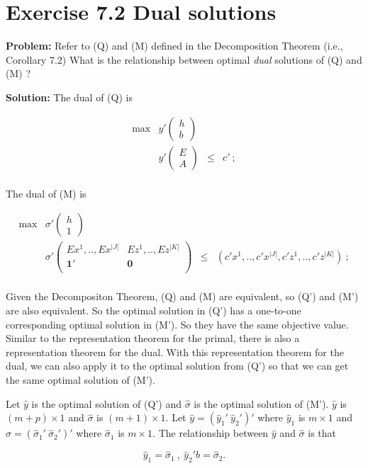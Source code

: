 \section{Exercise 7.2 Dual solutions}
\textbf{Problem:} Refer to (Q) and (M) defined in the Decomposition Theorem (i.e., Corollary 7.2) What is the relationship between optimal \emph{dual} solutions of (Q) and (M) ?

\textbf{Solution:} The dual of (Q) is

\[
\tag{$Q'$}
\begin{array}{ccrrcl}
 \max & y'\left(
  \begin{array}{c}
   h\\
   b
  \end{array}
\right)  &      &   \\
      &  y'\left(
  \begin{array}{c}
   E\\
   A
  \end{array}
\right)  &   \leq  & c'~; \\
\end{array}
\]

The dual of (M) is

\[
\tag{$M'$}
\begin{array}{ccrrcl}
 \max & \sigma'\left(
  \begin{array}{c}
   h\\
   1
  \end{array}
\right)  &      &   \\
      &  \sigma'\left(
  \begin{array}{cc}
   Ex^1,..,Ex^{|J|} & Ez^1,..,Ez^{|K|}\\
   \mathbf{1}' & \mathbf{0}\\
  \end{array}
\right)  &   \leq  & (c'x^1,..,c'x^{|J|},c'z^1,..,c'z^{|K|})~; \\
\end{array}
\]

Given the Decompositon Theorem, (Q) and (M) are equivalent, so (Q') and (M') are also equivalent. So the optimal solution in (Q') has a one-to-one corresponding optimal solution in (M'). So they have the same objective value. Similar to the representation theorem for the primal, there is also a representation theorem for the dual. With this representation theorem for the dual, we can also apply it to the optimal solution from (Q') so that we can get the same optimal solution of (M').

Let $\hat{y}$ is the optimal solution of (Q') and $\hat{\sigma}$ is the optimal solution of (M'). $\hat{y}$ is $(m+p)\times 1$ and $\hat{\sigma}$ is $(m+1)\times 1$. Let $\hat{y} = (\hat{y}_1'~\hat{y}_2')'$ where $\hat{y}_1$ is $m\times 1$ and $\hat{\sigma} = (\hat{\sigma}_1'~\hat{\sigma}_2')'$ where $\hat{\sigma}_1$ is $m\times 1$. The relationship between $\hat{y}$ and $\hat{\sigma}$ is that

$$\hat{y}_1 = \hat{\sigma}_1~,~\hat{y}_2'b = \hat{\sigma}_2. $$